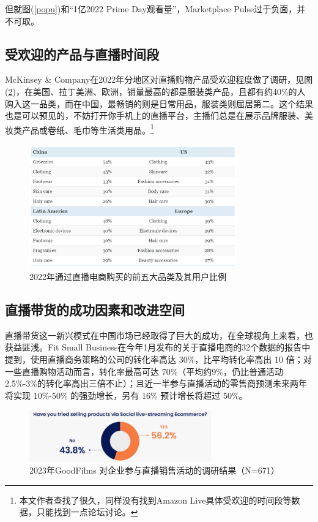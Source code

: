 \documentclass[12pt]{ctexart}
\begin{document}
但就图(\ref{popu})和“1亿2022 Prime Day观看量”\cite{5}，Marketplace Pulse过于负面，并不可取。

\subsection{受欢迎的产品与直播时间段}
McKinsey \& Company在2022年分地区对直播购物产品受欢迎程度做了调研，见图(\ref{cate})，在美国、拉丁美洲、欧洲，销量最高的都是服装类产品，且都有约40\%的人购入这一品类，而在中国，最畅销的则是日常用品，服装类则屈居第二。这个结果也是可以预见的，不妨打开你手机上的直播平台，主播们总是在展示品牌服装、美妆类产品或卷纸、毛巾等生活类用品。\footnote{本文作者查找了很久，同样没有找到Amazon Live具体受欢迎的时间段等数据，只能找到一点论坛讨论。}

\begin{figure}[htbp!]
    \centering
    \includegraphics[width=0.8\textwidth]{Images/5.png}
    \caption{2022年通过直播电商购买的前五大品类及其用户比例 \cite{7}}
    \label{cate}
\end{figure}


\subsection{直播带货的成功因素和改进空间}
直播带货这一新兴模式在中国市场已经取得了巨大的成功，在全球视角上来看，也获益匪浅。Fit Small Business在今年1月发布的关于直播电商的32个数据的报告\cite{5}中提到，使用直播商务策略的公司的转化率高达 30\%，比平均转化率高出 10 倍；对一些直播购物活动而言，转化率最高可达 70\%（平均约9\%，仍比普通活动2.5\%-3\%的转化率高出三倍不止）；且近一半参与直播活动的零售商预测未来两年将实现 10\%-50\% 的强劲增长，另有 16\% 预计增长将超过 50\%。

\begin{figure}[htbp!]
    \centering
    \includegraphics[width=0.7\textwidth]{Images/6.png}
    \caption{2023年GoodFilms 对企业参与直播销售活动的调研结果（N=671） \cite{7}}
    \label{cate}
\end{figure}
\end{document}
